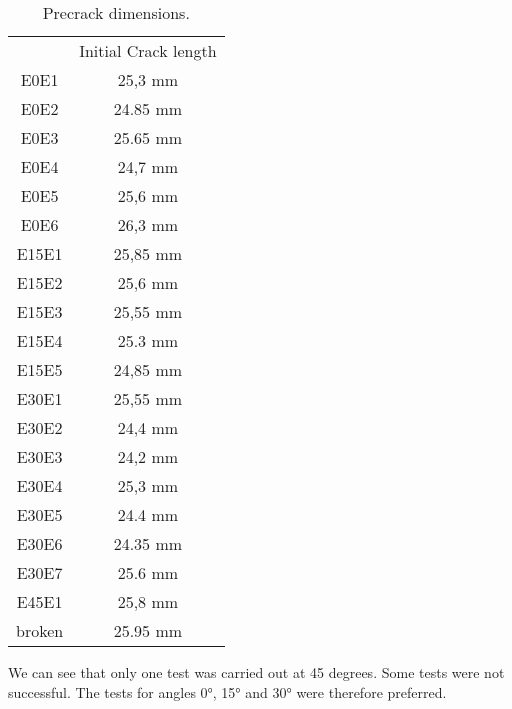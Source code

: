 \begin{table}[h]
	\centering
	\begin{tabular}{c c }
		\multicolumn{1}{l}{} & \multicolumn{1}{l}{Initial Crack length} \\
		\multicolumn{1}{c}{\cellcolor[HTML]{F8CBAD}E0E1} & 25,3   mm \\
		\multicolumn{1}{c}{\cellcolor[HTML]{F8CBAD}E0E2} & 24.85 mm \\
		\multicolumn{1}{c}{\cellcolor[HTML]{F8CBAD}E0E3} & 25.65 mm \\
		\multicolumn{1}{c}{\cellcolor[HTML]{F8CBAD}E0E4} & 24,7 mm \\ 
		\cellcolor[HTML]{F8CBAD}E0E5 & 25,6 mm \\ 
		\cellcolor[HTML]{F8CBAD}E0E6 & 26,3 mm \\ 
		\multicolumn{1}{c}{\cellcolor[HTML]{C65911}E15E1} & 25,85 mm \\ 
		\multicolumn{1}{c}{\cellcolor[HTML]{C65911}E15E2} & 25,6 mm \\ 
		\multicolumn{1}{c}{\cellcolor[HTML]{C65911}E15E3} & 25,55 mm \\ 
		\multicolumn{1}{c}{\cellcolor[HTML]{C65911}E15E4} & 25.3 mm \\
		\multicolumn{1}{c}{\cellcolor[HTML]{C65911}E15E5} & 24,85 mm \\ 
		\multicolumn{1}{c}{\cellcolor[HTML]{BF8F00}E30E1} & 25,55 mm \\ 
		\multicolumn{1}{c}{\cellcolor[HTML]{BF8F00}E30E2} & 24,4 mm \\ 
		\multicolumn{1}{c}{\cellcolor[HTML]{BF8F00}E30E3} & 24,2 mm \\ 
		\multicolumn{1}{c}{\cellcolor[HTML]{BF8F00}E30E4} & 25,3 mm \\ 
		\multicolumn{1}{c}{\cellcolor[HTML]{BF8F00}E30E5} & 24.4 mm \\ 
		\multicolumn{1}{c}{\cellcolor[HTML]{BF8F00}E30E6} & 24.35 mm \\ 
		\multicolumn{1}{c}{\cellcolor[HTML]{BF8F00}E30E7} & 25.6 mm \\
		\multicolumn{1}{c}{\cellcolor[HTML]{FFA500}E45E1} & 25,8 mm \\ 
		\multicolumn{1}{c}{\cellcolor[HTML]{00FF00}broken} & 25.95 mm \\  
	\end{tabular}
	\caption{Precrack dimensions.}
	\label{tab:Tab11}
\end{table}

We can see that only one test was carried out at 45 degrees. Some tests were not successful. The tests for angles 0°, 15° and 30° were therefore preferred.


